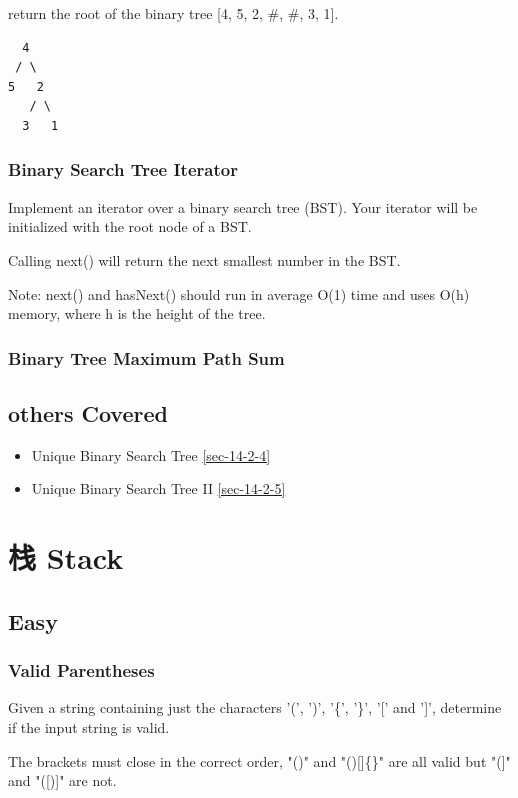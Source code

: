 \documentclass[12pt]{book}
\begin{document}
return the root of the binary tree [4, 5, 2, \#, \#, 3, 1].
\lstset{language=java,label= ,caption= ,numbers=none}
\begin{lstlisting}
  4
 / \
5   2
   / \
  3   1
\end{lstlisting}

\subsection{Binary Search Tree Iterator}
\label{sec-4-4-9}
Implement an iterator over a binary search tree (BST). Your iterator will be initialized with the root node of a BST.

Calling next() will return the next smallest number in the BST.

Note: next() and hasNext() should run in average O(1) time and uses O(h) memory, where h is the height of the tree.

\subsection{Binary Tree Maximum Path Sum}
\label{sec-4-4-10}
\section{others Covered}
\label{sec-4-5}
\begin{itemize}
\item Unique Binary Search Tree
\ref{sec-14-2-4}
\item Unique Binary Search Tree II
\ref{sec-14-2-5}
\end{itemize}

\chapter{栈 Stack}
\label{sec-5}
\section{Easy}
\label{sec-5-1}
\subsection{Valid Parentheses}
\label{sec-5-1-1}
Given a string containing just the characters '(', ')', '\{', '\}', '[' and ']', determine if the input string is valid.

The brackets must close in the correct order, "()" and "()[]\{\}" are all valid but "(]" and "([)]" are not.
\end{document}

